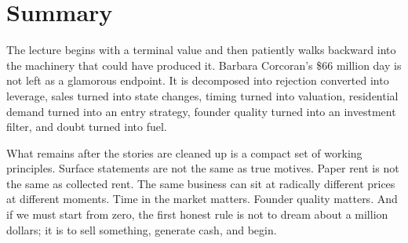\section{Summary}

The lecture begins with a terminal value and then patiently walks backward into the machinery that could have produced it. Barbara Corcoran's \$66 million day is not left as a glamorous endpoint. It is decomposed into rejection converted into leverage, sales turned into state changes, timing turned into valuation, residential demand turned into an entry strategy, founder quality turned into an investment filter, and doubt turned into fuel.

What remains after the stories are cleaned up is a compact set of working principles. Surface statements are not the same as true motives. Paper rent is not the same as collected rent. The same business can sit at radically different prices at different moments. Time in the market matters. Founder quality matters. And if we must start from zero, the first honest rule is not to dream about a million dollars; it is to sell something, generate cash, and begin.